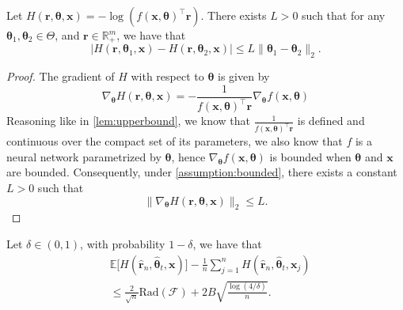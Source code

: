 \begin{lemma}
\label{lem:lipschitz}
    Let $H(\boldsymbol{r}, \boldsymbol{\theta}, \boldsymbol{x}) = -\log(f(\boldsymbol{x}, \boldsymbol{\theta})^\top \boldsymbol{r})$. There exists $L > 0$ such that for any $\boldsymbol{\theta}_1, \boldsymbol{\theta}_2 \in \Theta$, and $\boldsymbol{r} \in \mathbb{R}_{+}^m$, we have that
    \[
    |H(\boldsymbol{r}, \boldsymbol{\theta}_1, \boldsymbol{x}) -  H(\boldsymbol{r}, \boldsymbol{\theta}_2, \boldsymbol{x})| \leq L \|\boldsymbol{\theta}_1 - \boldsymbol{\theta}_2\|_2.
    \]
\end{lemma}
\begin{proof}
    The gradient of $H$ with respect to $\boldsymbol{\theta}$ is given by
    \[
    \nabla_{\boldsymbol{\theta}} H(\boldsymbol{r}, \boldsymbol{\theta}, \boldsymbol{x}) = -\frac{1}{f(\boldsymbol{x}, \boldsymbol{\theta})^\top \boldsymbol{r}} \nabla_{\boldsymbol{\theta}}f(\boldsymbol{x}, \boldsymbol{\theta})
    \]
    Reasoning like in \cref{lem:upperbound}, we know that $\frac{1}{f(\boldsymbol{x}, \boldsymbol{\theta})^\top \boldsymbol{r}}$ is defined and continuous over the compact set of its parameters, we also know that $f$ is a neural network parametrized by $\boldsymbol{\theta}$, hence $\nabla_{\boldsymbol{\theta}}f(\boldsymbol{x}, \boldsymbol{\theta})$ is bounded when $\boldsymbol{\theta}$ and $\boldsymbol{x}$ are bounded. Consequently, under \cref{assumption:bounded}, there exists a constant $L > 0$ such that
    \[
    \|\nabla_{\boldsymbol{\theta}} H(\boldsymbol{r}, \boldsymbol{\theta}, \boldsymbol{x})\|_2 \leq L.
    \]
\end{proof}


\begin{lemma}
\label{lem:rad1}
    Let $\delta \in (0,1)$, with probability $1-\delta$, we have that
    \begin{equation}
    \begin{aligned}
    &\mathbb{E}\bigg[H(\hat{\boldsymbol{r}}_{n}, \hat{\boldsymbol{\theta}}_t, \boldsymbol{x}) \bigg] - \frac{1}{n}\sum_{j=1}^{n}H(\hat{\boldsymbol{r}}_{n}, \hat{\boldsymbol{\theta}}_t, \boldsymbol{x}_j) \\
    & \leq \frac{2}{\sqrt{n}} \text{Rad}(\mathcal{F}) + 2B\sqrt{\frac{\log(4/\delta)}{n}}.
    \end{aligned}
    \end{equation}
\end{lemma}

